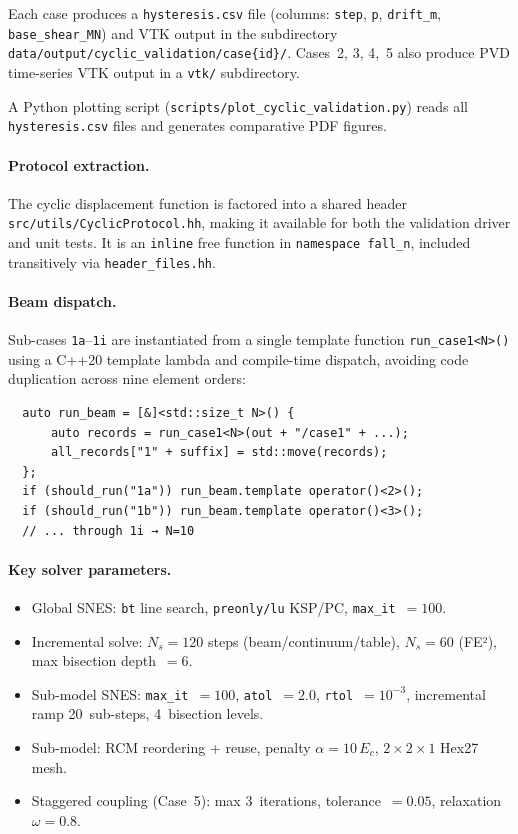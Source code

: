 Each case produces a \texttt{hysteresis.csv} file (columns:
\texttt{step}, \texttt{p}, \texttt{drift\_m},
\texttt{base\_shear\_MN}) and VTK output in the subdirectory
\texttt{data/output/cyclic\_validation/case\{id\}/}.  Cases~2, 3,
4,~5 also produce PVD time-series VTK output in a \texttt{vtk/}
subdirectory.

A Python plotting script
(\texttt{scripts/plot\_cyclic\_validation.py}) reads all
\texttt{hysteresis.csv} files and generates comparative PDF figures.

\paragraph{Protocol extraction.}
The cyclic displacement function is factored into a shared header
\texttt{src/utils/CyclicProtocol.hh}, making it available for both
the validation driver and unit tests.  It is an \texttt{inline}
free function in \texttt{namespace fall\_n}, included transitively
via \texttt{header\_files.hh}.

\paragraph{Beam dispatch.}
Sub-cases \texttt{1a}--\texttt{1i} are instantiated from a single
template function \texttt{run\_case1<N>()} using a C++20 template
lambda and compile-time dispatch, avoiding code duplication across
nine element orders:
\begin{verbatim}
  auto run_beam = [&]<std::size_t N>() {
      auto records = run_case1<N>(out + "/case1" + ...);
      all_records["1" + suffix] = std::move(records);
  };
  if (should_run("1a")) run_beam.template operator()<2>();
  if (should_run("1b")) run_beam.template operator()<3>();
  // ... through 1i → N=10
\end{verbatim}

\paragraph{Key solver parameters.}
\begin{itemize}
  \item Global SNES: \texttt{bt} line search, \texttt{preonly/lu}
    KSP/PC, \texttt{max\_it}~$= 100$.
  \item Incremental solve: $N_s = 120$ steps (beam/continuum/table),
    $N_s = 60$ (FE²), max bisection depth~$= 6$.
  \item Sub-model SNES: \texttt{max\_it}~$= 100$, \texttt{atol}~$= 2.0$,
    \texttt{rtol}~$= 10^{-3}$, incremental ramp 20~sub-steps,
    4~bisection levels.
  \item Sub-model: RCM reordering + reuse, penalty
    $\alpha = 10\,E_c$, $2 \times 2 \times 1$ Hex27 mesh.
  \item Staggered coupling (Case~5): max 3~iterations,
    tolerance~$= 0.05$, relaxation~$\omega = 0.8$.
\end{itemize}
